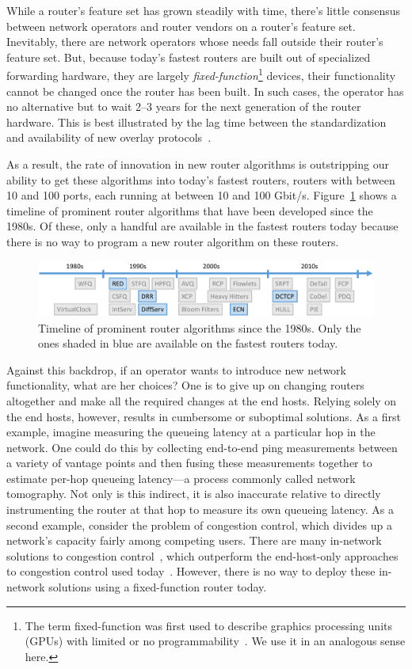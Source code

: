 While a router's feature set has grown steadily with time, there's little
consensus between network operators and router vendors on a router's feature
set. Inevitably, there are network operators whose needs fall outside their
router's feature set. But, because today's fastest routers are built out of
specialized forwarding hardware, they are largely {\em
fixed-function}\footnote{The term fixed-function was first used to describe
graphics processing units (GPUs) with limited or no
programmability~\cite{gpu_fixed}. We use it in an analogous sense here.}
devices, \ie their functionality cannot be changed once the router has been
built. In such cases, the operator has no alternative but to wait 2--3 years
for the next generation of the router hardware. This is best illustrated by the
lag time between the standardization and availability of new overlay
protocols~\cite{nvgre}.

As a result, the rate of innovation in new router algorithms is outstripping
our ability to get these algorithms into today's fastest routers, \ie routers with
between 10 and 100 ports, each running at between 10 and 100 Gbit/s.
Figure~\ref{fig:router_algos} shows a timeline of prominent router algorithms
that have been developed since the 1980s. Of these, only a handful are
available in the fastest routers today because there is no way to program a new
router algorithm on these routers.

\begin{figure}
\centering
\includegraphics[width=\columnwidth]{router_alg_timeline.pdf}
\caption{Timeline of prominent router algorithms since the 1980s. Only the ones
shaded in blue are available on the fastest routers today.}
\label{fig:router_algos}
\end{figure}

Against this backdrop, if an operator wants to introduce new network functionality, what
are her choices? One is to give up on changing routers altogether
and make all the required changes at the end hosts.  Relying solely on the end
hosts, however, results in cumbersome or suboptimal solutions. As a first
example, imagine measuring the queueing latency at a particular hop in the
network. One could do this by collecting end-to-end ping measurements between a
variety of vantage points and then fusing these measurements together to
estimate per-hop queueing latency---a process commonly called network
tomography. Not only is this indirect, it is also inaccurate relative to
directly instrumenting the router at that hop to measure its own queueing
latency. As a second example, consider the problem of congestion control, which
divides up a network's capacity fairly among competing users. There are many
in-network solutions to congestion control~\cite{xcp, rcp}, which outperform
the end-host-only approaches to congestion control used today~\cite{cubic,
compound}. However, there is no way to deploy these in-network solutions using
a fixed-function router today.

